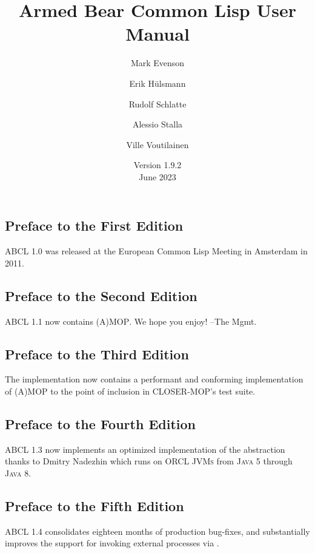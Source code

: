 \documentclass[10pt]{book}
\begin{document}
\title{Armed Bear Common Lisp User Manual}
\date{Version 1.9.2 \\
\smallskip
June 2023}
\author{Mark Evenson \and Erik H\"{u}lsmann \and Rudolf Schlatte \and
  Alessio Stalla \and Ville Voutilainen}

\maketitle

\tableofcontents

\subsection{Preface to the First Edition}
\textsc{ABCL} 1.0 was released at the European Common Lisp Meeting
in Amsterdam in 2011.

\subsection{Preface to the Second Edition}
\textsc{ABCL} 1.1 now contains \textsc{(A)MOP}.  We hope you enjoy!
--The Mgmt.

\subsection{Preface to the Third Edition}
The implementation now contains a performant and conforming
implementation of \textsc{(A)MOP} to the point of inclusion in
\textsc{CLOSER-MOP}'s test suite.

\subsection{Preface to the Fourth Edition}

\textsc{ABCL} 1.3 now implements an optimized implementation of the
 abstraction thanks to Dmitry
Nadezhin which runs on ORCL \textsc{JVMs} from \textsc{Java 5} through
\textsc{Java 8}.

\subsection{Preface to the Fifth Edition}

\textsc{ABCL} 1.4 consolidates eighteen months of production bug-fixes,
and substantially improves the support for invoking external
processes via .
\end{document}
